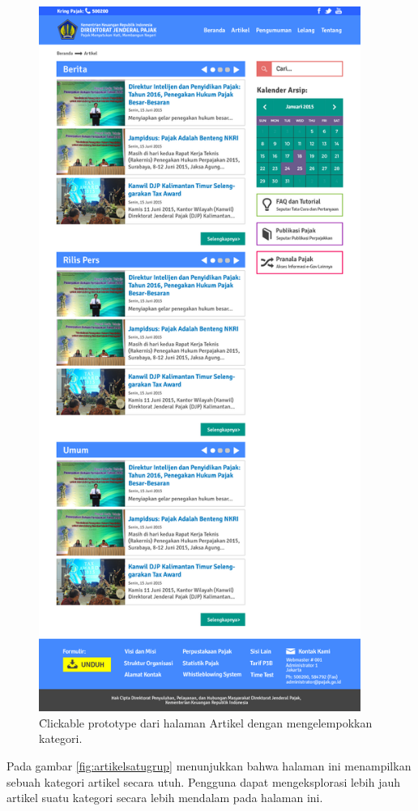 \begin{enumerate}
\begin{figure}
			\includegraphics[width=\textwidth,height=23cm]
			{pics/Artikelgrup.jpg}
			\caption{\f{Clickable prototype} dari halaman Artikel dengan mengelempokkan kategori.}
			\label{fig:artikelgrup}
		\end{figure}
	Pada gambar \ref{fig:artikelsatugrup} menunjukkan bahwa halaman ini menampilkan sebuah kategori artikel secara utuh. Pengguna dapat mengeksplorasi lebih jauh artikel suatu kategori secara lebih mendalam pada halaman ini.
		\begin{figure}
			\centering

\end{figure}
\end{enumerate}
